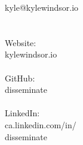 
\begin{minipage}[t]{0.25\hsize}\color{contact} %
	kyle@kylewindsor.io\\
	\\\\
	Website:\\
	kylewindsor.io\\
	\\
	GitHub:\\
	disseminate\\
	\\
	LinkedIn:\\
	ca.linkedin.com/in/\\
	disseminate\\
\end{minipage}
